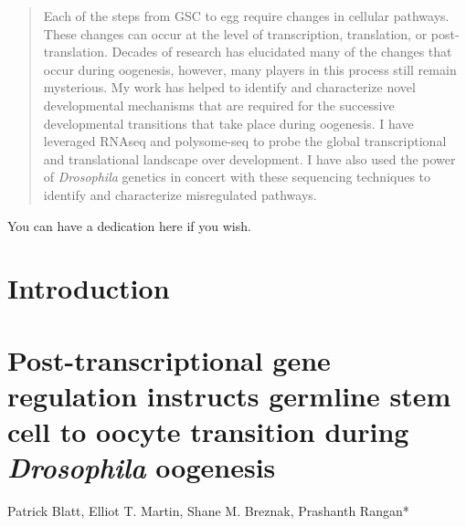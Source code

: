 \documentclass[12pt,twoside]{reedthesis}
\begin{document}
\begin{abstract}
    Each of the steps from GSC to egg require changes in cellular pathways. These changes can occur at the level of transcription, translation, or post-translation. Decades of research has elucidated many of the changes that occur during oogenesis, however, many players in this process still remain mysterious. My work has helped to identify and characterize novel developmental mechanisms that are required for the successive developmental transitions that take place during oogenesis. I have leveraged RNAseq and polysome-seq to probe the global transcriptional and translational landscape over development. I have also used the power of \emph{Drosophila} genetics in concert with these sequencing techniques to identify and characterize misregulated pathways.
  \end{abstract}
  \begin{dedication}
    You can have a dedication here if you wish.
  \end{dedication}
\mainmatter %
\pagestyle{fancyplain} %

\hypertarget{introduction}{%
\chapter*{Introduction}\label{introduction}}

















\hypertarget{post-transcriptional-gene-regulation-instructs-germline-stem-cell-to-oocyte-transition-during-drosophila-oogenesis}{%
\chapter{\texorpdfstring{Post-transcriptional gene regulation instructs germline stem cell to oocyte transition during \emph{Drosophila} oogenesis}{Post-transcriptional gene regulation instructs germline stem cell to oocyte transition during Drosophila oogenesis}}\label{post-transcriptional-gene-regulation-instructs-germline-stem-cell-to-oocyte-transition-during-drosophila-oogenesis}}

Patrick Blatt, Elliot T. Martin, Shane M. Breznak, Prashanth Rangan*
\end{document}
